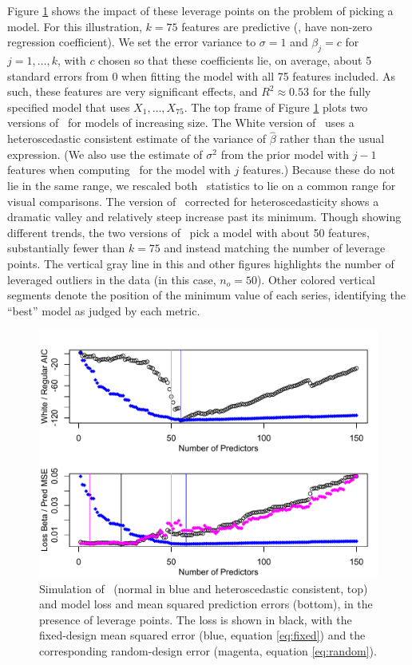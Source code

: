 \documentclass[12pt]{article}
\begin{document}
 Figure \ref{fig:example1} shows the impact of these leverage points on the
 problem of picking a model.  For this illustration, $k = 75$ features are
 predictive (\ie, have non-zero regression coefficient).  We set the error
 variance to $\sigma=1$ and $\beta_j = c$ for $j = 1,\ldots,k$, with $c$ chosen
 so that these coefficients lie, on average, about 5 standard errors from 0 when
 fitting the model with all 75 features included.  As such, these features are
 very significant effects, and $R^2 \approx 0.53$ for the fully specified model
 that uses $X_1,\ldots,X_{75}$.  The top frame of Figure \ref{fig:example1}
 plots two versions of \aic\ for models of increasing size.  The White version
 of \aic\ uses a heteroscedastic consistent estimate of the variance of
 $\hat\beta$ rather than the usual expression. (We also use the estimate of
 $\sigma^2$ from the prior model with $j-1$ features when computing \aic\ for
 the model with $j$ features.)  Because these do not lie in the same range, we
 rescaled both \aic\ statistics to lie on a common range for visual comparisons.
  The version of \aic\ corrected for heteroscedasticity shows a dramatic valley
 and relatively steep increase past its minimum.  Though showing different
 trends, the two versions of \aic\ pick a model with about 50 features,
 substantially fewer than $k=75$ and instead matching the number of leverage
 points.  The vertical gray line in this and other figures highlights the number
 of leveraged outliers in the data (in this case, $n_o=50$).  Other colored
 vertical segments denote the position of the minimum value of each series,
 identifying the ``best'' model as judged by each metric.

 \begin{figure}
 \caption{ Simulation of \aic\ (normal in blue and heteroscedastic consistent,
 top) and model loss and mean squared prediction errors (bottom), in the
 presence of leverage points.  The loss is shown in black, with the fixed-design
 mean squared error (blue, equation \ref{eq:fixed}) and the corresponding
 random-design error (magenta, equation \ref{eq:random}). }
 \label{fig:example1}
  \centerline{ \includegraphics[width=5in]{figures/example1.pdf} }
 \end{figure}
\end{document}
